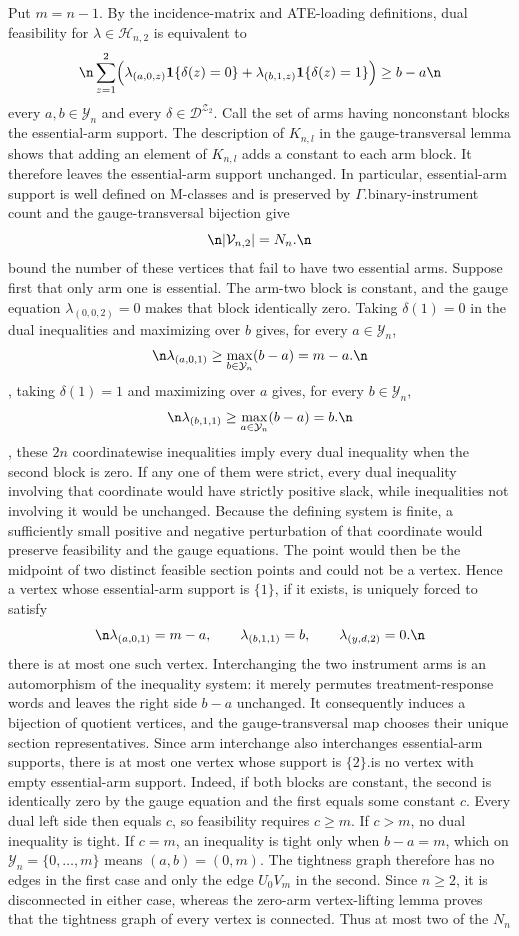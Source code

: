 Put \(m=n-1\). By the incidence-matrix and ATE-loading definitions, dual feasibility for \(\lambda\in\mathcal H_{n,2}\) is equivalent to\n\[\n\sum_{z=1}^{2}\Bigl(\lambda_{(a,0,z)}\mathbf 1\{\delta(z)=0\}+\lambda_{(b,1,z)}\mathbf 1\{\delta(z)=1\}\Bigr)\ge b-a\n\]\nfor every \(a,b\in\mathcal Y_n\) and every \(\delta\in\mathcal D^{\mathcal Z_2}\). Call the set of arms having nonconstant blocks the essential-arm support. The description of \(K_{n,l}\) in the gauge-transversal lemma shows that adding an element of \(K_{n,l}\) adds a constant to each arm block. It therefore leaves the essential-arm support unchanged. In particular, essential-arm support is well defined on M-classes and is preserved by \(\Gamma\).\n\nThe binary-instrument count and the gauge-transversal bijection give\n\[\n|\mathcal V_{n,2}|=N_n.\n\]\nWe bound the number of these vertices that fail to have two essential arms. Suppose first that only arm one is essential. The arm-two block is constant, and the gauge equation \(\lambda_{(0,0,2)}=0\) makes that block identically zero. Taking \(\delta(1)=0\) in the dual inequalities and maximizing over \(b\) gives, for every \(a\in\mathcal Y_n\),\n\[\n\lambda_{(a,0,1)}\ge\max_{b\in\mathcal Y_n}(b-a)=m-a.\n\]\nLikewise, taking \(\delta(1)=1\) and maximizing over \(a\) gives, for every \(b\in\mathcal Y_n\),\n\[\n\lambda_{(b,1,1)}\ge\max_{a\in\mathcal Y_n}(b-a)=b.\n\]\nConversely, these \(2n\) coordinatewise inequalities imply every dual inequality when the second block is zero. If any one of them were strict, every dual inequality involving that coordinate would have strictly positive slack, while inequalities not involving it would be unchanged. Because the defining system is finite, a sufficiently small positive and negative perturbation of that coordinate would preserve feasibility and the gauge equations. The point would then be the midpoint of two distinct feasible section points and could not be a vertex. Hence a vertex whose essential-arm support is \(\{1\}\), if it exists, is uniquely forced to satisfy\n\[\n\lambda_{(a,0,1)}=m-a,\qquad \lambda_{(b,1,1)}=b,\qquad \lambda_{(y,d,2)}=0.\n\]\nThus there is at most one such vertex. Interchanging the two instrument arms is an automorphism of the inequality system: it merely permutes treatment-response words and leaves the right side \(b-a\) unchanged. It consequently induces a bijection of quotient vertices, and the gauge-transversal map chooses their unique section representatives. Since arm interchange also interchanges essential-arm supports, there is at most one vertex whose support is \(\{2\}\).\n\nThere is no vertex with empty essential-arm support. Indeed, if both blocks are constant, the second is identically zero by the gauge equation and the first equals some constant \(c\). Every dual left side then equals \(c\), so feasibility requires \(c\ge m\). If \(c>m\), no dual inequality is tight. If \(c=m\), an inequality is tight only when \(b-a=m\), which on \(\mathcal Y_n=\{0,\ldots,m\}\) means \((a,b)=(0,m)\). The tightness graph therefore has no edges in the first case and only the edge \(U_0V_m\) in the second. Since \(n\ge2\), it is disconnected in either case, whereas the zero-arm vertex-lifting lemma proves that the tightness graph of every vertex is connected. Thus at most two of the \(N_n\) 